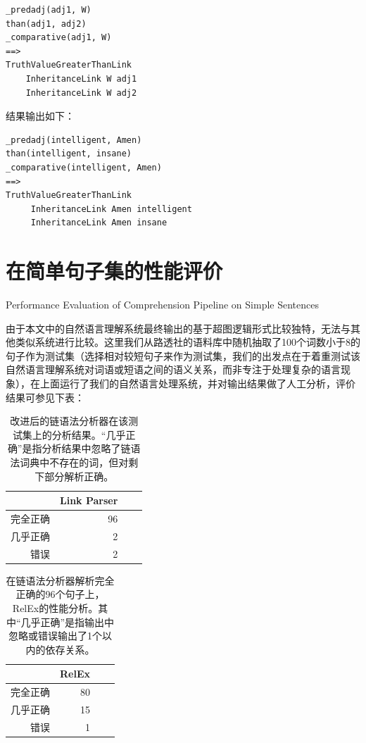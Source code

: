 {\tt\begin{small}\begin{lstlisting}
_predadj(adj1, W)
than(adj1, adj2)
_comparative(adj1, W)
==>
TruthValueGreaterThanLink
    InheritanceLink W adj1
    InheritanceLink W adj2
 \end{lstlisting}\end{small}}
 
结果输出如下：

 {\tt\begin{small}\begin{lstlisting}
_predadj(intelligent, Amen)
than(intelligent, insane)
_comparative(intelligent, Amen)
==>
TruthValueGreaterThanLink
     InheritanceLink Amen intelligent
     InheritanceLink Amen insane
 \end{lstlisting}\end{small}}

\section{在简单句子集的性能评价}{Performance Evaluation of Comprehension Pipeline on Simple Sentences}


由于本文中的自然语言理解系统最终输出的基于超图逻辑形式比较独特，无法与其他类似系统进行比较。这里我们从路透社的语料库中随机抽取了100个词数小于8的句子作为测试集（选择相对较短句子来作为测试集，我们的出发点在于着重测试该自然语言理解系统对词语或短语之间的语义关系，而非专注于处理复杂的语言现象），在上面运行了我们的自然语言处理系统，并对输出结果做了人工分析，评价结果可参见下表：


\FloatBarrier

\begin{table}
\center
\begin{tabular}{|r|r|r||c|}
\hline
 & Link Parser\\
\hline
完全正确 & 96   \\
几乎正确 & 2    \\
错误 & 2       \\

\hline
\end{tabular}
\caption{改进后的链语法分析器在该测试集上的分析结果。“几乎正确”是指分析结果中忽略了链语法词典中不存在的词，但对剩下部分解析正确。}
\label{table:settings}
\end{table}


\begin{table}
\center
\begin{tabular}{|r|r|r||c|}
\hline
 & RelEx\\
\hline
完全正确 & 80    \\
几乎正确 & 15     \\
错误 & 1     \\

\hline
\end{tabular}
\caption{在链语法分析器解析完全正确的96个句子上，RelEx的性能分析。其中“几乎正确”是指输出中忽略或错误输出了1个以内的依存关系。}
\label{table:settings}
\end{table}

